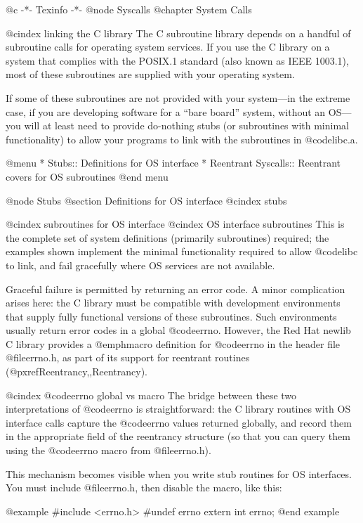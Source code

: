 @c                                           -*- Texinfo -*-
@node Syscalls
@chapter System Calls

@cindex linking the C library
The C subroutine library depends on a handful of subroutine calls for
operating system services.  If you use the C library on a system that
complies with the POSIX.1 standard (also known as IEEE 1003.1), most of
these subroutines are supplied with your operating system.

If some of these subroutines are not provided with your system---in
the extreme case, if you are developing software for a ``bare board''
system, without an OS---you will at least need to provide do-nothing
stubs (or subroutines with minimal functionality) to allow your
programs to link with the subroutines in @code{libc.a}.

@menu
* Stubs::		Definitions for OS interface
* Reentrant Syscalls::	Reentrant covers for OS subroutines
@end menu

@node Stubs
@section Definitions for OS interface
@cindex stubs

@cindex subroutines for OS interface
@cindex OS interface subroutines
This is the complete set of system definitions (primarily subroutines)
required; the examples shown implement the minimal functionality
required to allow @code{libc} to link, and fail gracefully where OS
services are not available.  

Graceful failure is permitted by returning an error code.  A minor
complication arises here: the C library must be compatible with
development environments that supply fully functional versions of these
subroutines.  Such environments usually return error codes in a global
@code{errno}.  However, the Red Hat newlib C library provides a @emph{macro}
definition for @code{errno} in the header file @file{errno.h}, as part
of its support for reentrant routines (@pxref{Reentrancy,,Reentrancy}).

@cindex @code{errno} global vs macro
The bridge between these two interpretations of @code{errno} is
straightforward: the C library routines with OS interface calls
capture the @code{errno} values returned globally, and record them in
the appropriate field of the reentrancy structure (so that you can query
them using the @code{errno} macro from @file{errno.h}).

This mechanism becomes visible when you write stub routines for OS
interfaces.   You must include @file{errno.h}, then disable the macro,
like this:

@example
#include <errno.h>
#undef errno
extern int errno;
@end example

